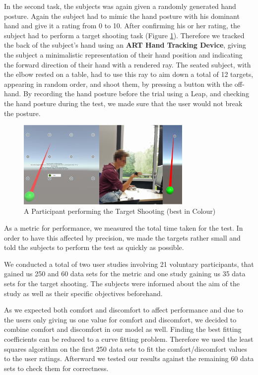 \documentclass{sig-alternate-05-2015}
\begin{document}
In the second task, the subjects was again given a randomly generated hand posture. Again the subject had to mimic the hand posture with his dominant hand and give it a rating from 0 to 10. After confirming his or her rating, the subject had to perform a target shooting task (Figure \ref{fig:participant}). Therefore we tracked the back of the subject's hand using an \textbf{ART Hand Tracking Device}, giving the subject a minimalistic representation of their hand position and indicating the forward direction of their hand with a rendered ray. The seated subject, with the elbow rested on a table, had to use this ray to aim down a total of 12 targets, appearing in random order, and shoot them, by pressing a button with the off-hand. By recording the hand posture before the trial using a Leap, and checking the hand posture during the test, we made sure that the user would not break the posture. 

\begin{figure}[h]
\centering
\includegraphics[width=8.45cm]{Participant}
\vspace{-20pt}
\caption{A Participant performing the Target Shooting (best in Colour)}
\label{fig:participant}
\vspace{-10pt}
\end{figure}

As a metric for performance, we measured the total time taken for the test. In order to have this affected by precision, we made the targets rather small and told the subjects to perform the test as quickly as possible.

We conducted a total of two user studies involving 21 voluntary participants, that gained us 250 and 60 data sets for the metric and one study gaining us 35 data sets for the target shooting.
The subjects were informed about the aim of the study as well as their specific objectives beforehand.

As we expected both comfort and discomfort to affect performance and due to the users only giving us one value for comfort and discomfort, we decided to combine comfort and discomfort in our model as well. Finding the best fitting coefficients can be reduced to a curve fitting problem. Therefore we used the least squares algorithm on the first 250 data sets to fit the comfort/discomfort values to the user ratings. Afterward we tested our results against the remaining 60 data sets to check them for correctness. 
\end{document}
